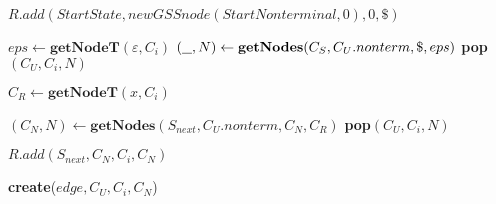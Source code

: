 \begin{algorithmic}
    \State $R.add(StartState, new GSSnode(StartNonterminal,0), 0, \$)$
    
    \State $eps \gets \textbf{getNodeT}(\varepsilon, C_{i})$  
    \State $(\underline{\hspace{0.25cm}}, N) \gets \textbf{getNodes}(C_{S},C_{U}.nonterm, \$, eps)$
    \State \textbf{pop}$(C_{U},C_{i},N)$ 
    \EndIf
    
            \State $C_{R} \gets \textbf{getNodeT}(x, C_{i})$
            
                        
            \State $(C_{N}, N) \gets \textbf{getNodes}(S_{next},C_{U}.nonterm, C_{N}, C_{R})$
                \State \textbf{pop}$(C_{U},C_{i},N)$ 
            \EndIf
            
                \State $R.add(S_{next}, C_{N}, C_{i}, C_{N})$
            \EndIf
            
        \EndCase
    
            \State \textbf{create}($edge, C_{U}, C_{i}, C_{N}$)
        \EndCase
        \EndSwitch
        
    \EndFor
    \EndWhile
\EndFunction
\end{algorithmic}